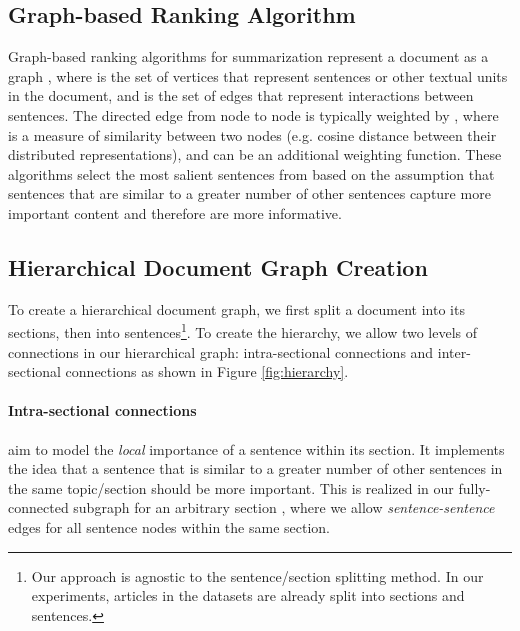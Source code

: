\documentclass[11pt,a4paper]{article}
\begin{document}
\subsection{Graph-based Ranking Algorithm}
Graph-based ranking algorithms for summarization represent a document as a graph , where  is the set of vertices that represent sentences or other textual units in the document, and  is the set of edges that represent interactions between sentences. The directed edge  from node  to node  is typically weighted by , where  is a measure of similarity between two nodes (e.g. cosine distance between their distributed representations), and  can be an additional weighting function. These algorithms select the most salient sentences from  based on the assumption that sentences that are similar to a greater number of other sentences capture more important content and therefore are more informative.

\subsection{Hierarchical Document Graph Creation}\label{sub-sec:method_hierarchy}
To create a hierarchical document graph, we first split a document into its sections, then into sentences\footnote{Our approach is agnostic to the sentence/section splitting method. In our experiments, articles in the datasets are already split into sections and sentences.}.  To create the hierarchy, we allow two levels of connections in our hierarchical graph: intra-sectional connections and inter-sectional connections as shown in Figure \ref{fig:hierarchy}.
\paragraph{Intra-sectional connections} aim to model the \textit{local} importance of a sentence within its section. It implements the idea that a sentence that is similar to a greater number of other sentences in the same topic/section should be more important. This is realized in our fully-connected subgraph for an arbitrary section , where we allow  \textit{sentence-sentence} edges for all sentence nodes within the same section.
\end{document}
